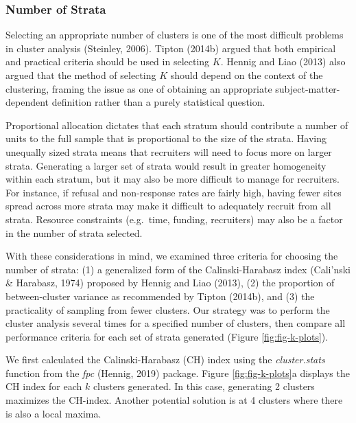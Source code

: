 \documentclass[
  english,
  man,floatsintext]{apa6}
\begin{document}
\hypertarget{number-of-strata}{%
\subsubsection{Number of Strata}\label{number-of-strata}}

Selecting an appropriate number of clusters is one of the most difficult problems in cluster analysis (Steinley, 2006). Tipton (2014b) argued that both empirical and practical criteria should be used in selecting \(K\). Hennig and Liao (2013) also argued that the method of selecting \(K\) should depend on the context of the clustering, framing the issue as one of obtaining an appropriate subject-matter-dependent definition rather than a purely statistical question.

Proportional allocation dictates that each stratum should contribute a number of units to the full sample that is proportional to the size of the strata. Having unequally sized strata means that recruiters will need to focus more on larger strata. Generating a larger set of strata would result in greater homogeneity within each stratum, but it may also be more difficult to manage for recruiters. For instance, if refusal and non-response rates are fairly high, having fewer sites spread across more strata may make it difficult to adequately recruit from all strata. Resource constraints (e.g.~time, funding, recruiters) may also be a factor in the number of strata selected.

With these considerations in mind, we examined three criteria for choosing the number of strata: (1) a generalized form of the Calinski-Harabasz index (Cali'nski \& Harabasz, 1974) proposed by Hennig and Liao (2013), (2) the proportion of between-cluster variance as recommended by Tipton (2014b), and (3) the practicality of sampling from fewer clusters. Our strategy was to perform the cluster analysis several times for a specified number of clusters, then compare all performance criteria for each set of strata generated (Figure \ref{fig:fig-k-plots}).

We first calculated the Calinski-Harabasz (CH) index using the \emph{cluster.stats} function from the \emph{fpc} (Hennig, 2019) package. Figure \ref{fig:fig-k-plots}a displays the CH index for each \(k\) clusters generated. In this case, generating 2 clusters maximizes the CH-index. Another potential solution is at 4 clusters where there is also a local maxima.
\end{document}
